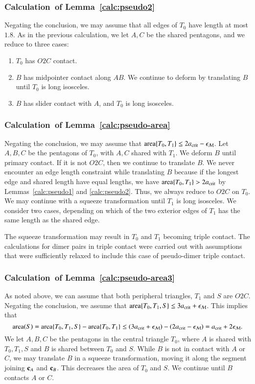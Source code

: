 \subsubsection{Calculation~of Lemma~\ref{calc:pseudo2}} 
Negating the conclusion, we may assume that all edges of $T_0$ have
length at most $1.8$.  As in the previous calculation, we let $A,C$ be
the shared pentagons, and we reduce to three cases:
\begin{enumerate}
\item $T_0$ has $O2C$ contact.
\item $B$ has midpointer contact along $AB$.  We continue to deform by
  translating $B$ until $T_0$ is long isosceles.
\item $B$ has slider contact with $A$, and $T_0$ is long isosceles.
\end{enumerate}

\subsubsection{Calculation~of Lemma~\ref{calc:pseudo-area}} 
Negating the conclusion, we may assume that ${\operatorname{area}}\{T_0,T_1\}\le
2a_\text{crit} - \epsilon_{\mathcal M}$.  Let $A,B,C$ be the pentagons of $T_0$, with $A,C$
shared with $T_1$.  We deform $B$ until primary contact.  If it is not
$O2C$, then we continue to translate $B$.  We never encounter an edge
length constraint while translating $B$ because if the longest edge and
shared length have equal lengths, we have ${\operatorname{area}}\{T_0,T_1\} > 2a_\text{crit}$
by Lemmas~\ref{calc:pseudo1} and \ref{calc:pseudo2}.  Thus, we always
reduce to $O2C$ on $T_0$.  We may continue with a squeeze
transformation until $T_1$ is long isosceles.  We consider two cases,
depending on which of the two exterior edges of $T_1$ has the same
length as the shared edge.

The squeeze transformation may result in $T_0$ and $T_1$ becoming
triple contact.  The calculations for dimer pairs in triple contact
were carried out with assumptions that were sufficiently relaxed to
include this case of pseudo-dimer triple contact.

\subsubsection{Calculation~of Lemma~\ref{calc:pseudo-area3}}
As noted above, we can assume that both peripheral triangles, $T_1$
and $S$ are $O2C$.  Negating the conclusion, we assume that
${\operatorname{area}}\{T_0,T_1,S\}\le 3a_\text{crit}+\epsilon_{\mathcal M}$.  This implies that
\[
{\operatorname{area}}(S) = {\operatorname{area}}\{T_0,T_1,S\} - {\operatorname{area}}\{T_0,T_1\} \le (3a_\text{crit}+\epsilon_{\mathcal M}) - (2a_\text{crit} - \epsilon_{\mathcal M}) = a_\text{crit} + 2\epsilon_{\mathcal M}.
\]
We let $A,B,C$ be the pentagons in the central triangle $T_0$, where
$A$ is shared with $T_0,T_1,S$ and $B$ is shared between $T_0$ and
$S$.  While $B$ is not in contact with $A$ or $C$, we may translate
$B$ in a squeeze transformation, moving it along the segment joining
${\mathbf c}_A$ and ${\mathbf c}_B$.  This decreases the area of $T_0$ and $S$.  We
continue until $B$ contacts $A$ or $C$.


